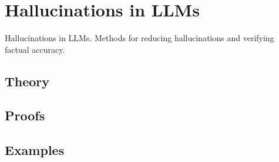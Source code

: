 
\section{Hallucinations in LLMs}
\label{sec:2.5.11-llm-hallucinations}

\begin{ticket}
Hallucinations in LLMs. Methods for reducing hallucinations and verifying factual accuracy.
\end{ticket}

\subsection*{Theory}

\subsection*{Proofs}

\subsection*{Examples}
